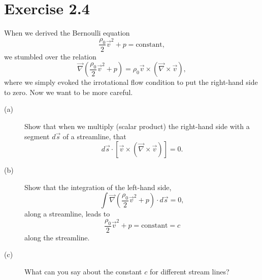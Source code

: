\documentclass[a4paper, 10pt]{article}
\begin{document}
\section*{Exercise 2.4}
When we derived the Bernoulli equation
\begin{equation}
    \frac{\rho_0}{2}\vec{v}^2+p=\mathrm{constant},
\end{equation}
we stumbled over the relation
\begin{equation}
    \vec{\nabla}\left(\frac{\rho_0}{2}\vec{v}^2+p\right) = \rho_0\vec{v}\times\left(\vec{\nabla}\times\vec{v}\right),
\end{equation}
where we simply evoked the irrotational flow condition to put the right-hand side to zero. Now we want to be more careful.

\begin{description}
    \item[(a)]
        Show that when we multiply (scalar product) the right-hand side with a segment $d\vec{s}$ of a streamline, that
        \begin{equation}
            d\vec{s}\cdot\left[\vec{v}\times\left(\vec{\nabla}\times\vec{v}\right)\right]=0.
        \end{equation}

    \item[(b)]
        Show that the integration of the left-hand side,
        \begin{equation}
            \int\vec{\nabla}\left(\frac{\rho_0}{2}\vec{v}^2+p\right)\cdot d\vec{s} = 0,
        \end{equation}
        along a streamline, leads to
        \begin{equation}
            \frac{\rho_0}{2}\vec{v}^2+p=\mathrm{constant}=c
        \end{equation}
        along the streamline.

    \item[(c)]
        What can you say about the constant $c$ for different stream lines?
\end{description}
\end{document}
